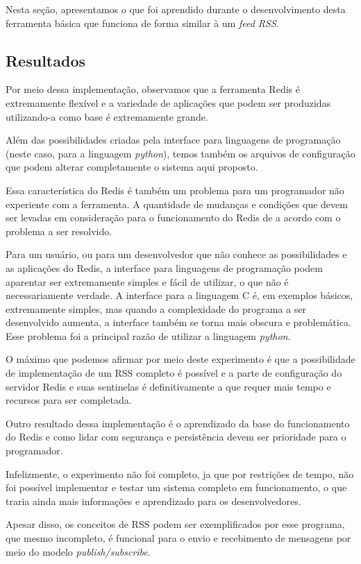 \documentclass[10pt]{IEEEtran}
\begin{document}
Nesta seção, apresentamos o que foi aprendido durante o desenvolvimento desta ferramenta básica que funciona de forma similar à um \textit{feed RSS}.

\subsection{Resultados}

Por meio dessa implementação, observamos que a ferramenta Redis é extremamente flexível e a variedade de aplicações que podem ser produzidas utilizando-a como base é extremamente grande.

Além das possibilidades criadas pela interface para linguagens de programação (neste caso, para a linguagem \textit{python}), temos também os arquivos de configuração que podem alterar completamente o sistema aqui proposto.

Essa característica do Redis é também um problema para um programador não experiente com a ferramenta. A quantidade de mudanças e condições que devem ser levadas em consideração para o funcionamento do Redis de a acordo com o problema a ser resolvido.

Para um usuário, ou para um desenvolvedor que não conhece as possibilidades e as aplicações do Redis, a interface para linguagens de programação podem aparentar ser extremamente simples e fácil de utilizar, o que não é necessariamente verdade. A interface para a linguagem C é, em exemplos básicos, extremamente simples, mas quando a complexidade do programa a ser desenvolvido aumenta, a interface também se torna mais obscura e problemática. Esse problema foi a principal razão de utilizar a linguagem \textit{python}.

O máximo que podemos afirmar por meio deste experimento é que a possibilidade de implementação de um RSS completo é possível e a parte de configuração do servidor Redis e suas sentinelas é definitivamente a que requer mais tempo e recursos para ser completada.

Outro resultado dessa implementação é o aprendizado da base do funcionamento do Redis e como lidar com segurança e persistência devem ser prioridade para o programador.

Infelizmente, o experimento não foi completo, ja que por restrições de tempo, não foi possível implementar e testar um sistema completo em funcionamento, o que traria ainda mais informações e aprendizado para os desenvolvedores.

Apesar disso, os conceitos de RSS podem ser exemplificados por esse programa, que mesmo incompleto, é funcional para o envio e recebimento de mensagens por meio do modelo \textit{publish/subscribe}.
\end{document}
